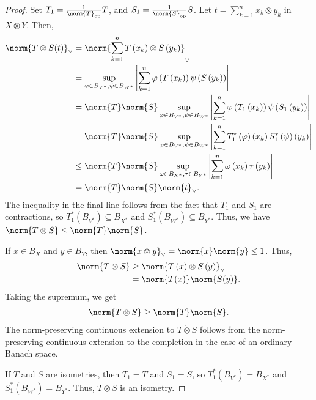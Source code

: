 \documentclass[10pt]{mypackage}
\begin{document}
\begin{proof}
  Set $T_1 = \frac{1}{\norm{T}_{\text{op}}}T$, and $S_1 = \frac{1}{\norm{S}_{\text{op}}}S$. Let $t = \sum_{k=1}^{n}x_k\otimes y_k$ in $X\otimes Y$. Then,
  \begin{align*}
    \norm{T\otimes S(t)}_{\vee} &= \norm{\sum_{k=1}^{n}T\left(x_k\right)\otimes S\left(y_k\right)}_{\vee}\\
                                &= \sup_{\varphi\in B_{V^{\ast}},\psi\in B_{W^{\ast}}}\left\vert \sum_{k=1}^{n}\varphi\left(T\left(x_k\right)\right)\psi\left(S\left(y_k\right)\right) \right\vert\\
                                &= \norm{T}\norm{S} \sup_{\varphi\in B_{V^{\ast}},\psi\in B_{W^{\ast}}}\left\vert \sum_{k=1}^{n} \varphi\left(T_{1}\left(x_{k}\right)\right)\psi\left(S_{1}\left(y_k\right)\right)\right\vert\\
                                &= \norm{T}\norm{S} \sup_{\varphi\in B_{V^{\ast}},\psi\in B_{W^{\ast}}}\left\vert \sum_{k=1}^{n}T_1^{\ast}\left(\varphi\right)\left(x_k\right)S_{1}^{\ast}\left(\psi\right)\left(y_k\right) \right\vert\\
                                &\leq \norm{T}\norm{S}\sup_{\omega\in B_{X^{\ast}},\tau\in B_{Y^{\ast}}}\left\vert \sum_{k=1}^{n}\omega\left(x_k\right)\tau\left(y_k\right) \right\vert\\
                                &= \norm{T}\norm{S}\norm{t}_{\vee}.
  \end{align*}
  The inequality in the final line follows from the fact that $T_{1}$ and $S_1$ are contractions, so $T_1^{\ast}\left(B_{V^{\ast}}\right)\subseteq B_{X^{\ast}}$ and $S_{1}^{\ast}\left(B_{W^{\ast}}\right)\subseteq B_{Y^{\ast}}$. Thus, we have $\norm{T\otimes S} \leq \norm{T}\norm{S}$.\newline

  If $x\in B_{X}$ and $y\in B_{Y}$, then $\norm{x\otimes y}_{\vee} = \norm{x}\norm{y} \leq 1$. Thus,
  \begin{align*}
    \norm{T\otimes S} &\geq \norm{T\left(x\right)\otimes S\left(y\right)}_{\vee}\\
                      &= \norm{T(x)}\norm{S(y)}.
  \end{align*}
  Taking the supremum, we get
  \begin{align*}
    \norm{T\otimes S}\geq \norm{T}\norm{S}.
  \end{align*}
  The norm-preserving continuous extension to $T\check\otimes S$ follows from the norm-preserving continuous extension to the completion in the case of an ordinary Banach space.\newline

  If $T$ and $S$ are isometries, then $T_1 = T$ and $S_1 = S$, so $T_{1}^{\ast}\left(B_{V^{\ast}}\right) = B_{X^{\ast}}$ and $S_{1}^{\ast}\left(B_{W^{\ast}}\right) = B_{Y^{\ast}}$. Thus, $T\otimes S$ is an isometry.
\end{proof}
\end{document}
